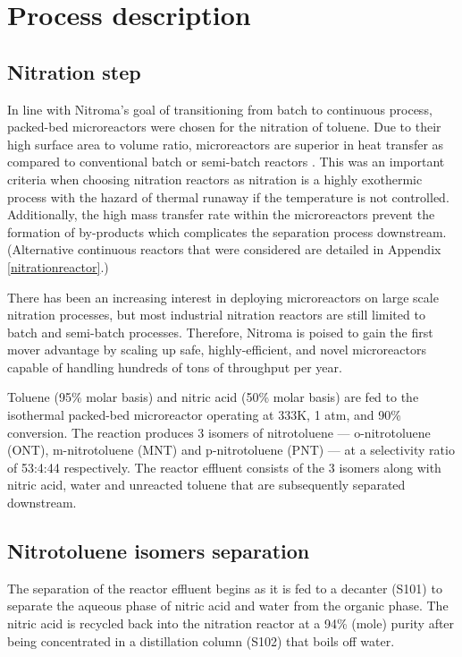 \section{Process description}
\label{sec:process}
\subsection{Nitration step}
In line with Nitroma's goal of transitioning from batch to continuous process, packed-bed microreactors were chosen for the nitration of toluene. Due to their high surface area to volume ratio, microreactors are superior in heat transfer as compared to conventional batch or semi-batch reactors \cite{halder_nitration_2007}. This was an important criteria when choosing nitration reactors as nitration is a highly exothermic process with the hazard of thermal runaway if the temperature is not controlled. Additionally, the high mass transfer rate within the microreactors prevent the formation of by-products \cite{halder_nitration_2007} which complicates the separation process downstream.
(Alternative continuous reactors that were considered are detailed in Appendix \ref{nitrationreactor}.)

There has been an increasing interest in deploying microreactors on large scale nitration processes, but most industrial nitration reactors are still limited to batch and semi-batch processes. Therefore, Nitroma is poised to gain the first mover advantage by scaling up safe, highly-efficient, and novel microreactors capable of handling hundreds of tons of throughput per year.

Toluene (95\% molar basis) and nitric acid (50\% molar basis) are fed to the isothermal packed-bed microreactor operating at 333K, 1 atm, and 90\% conversion. The reaction produces 3 isomers of nitrotoluene --- o-nitrotoluene (ONT), m-nitrotoluene (MNT) and p-nitrotoluene (PNT) --- at a selectivity ratio of 53:4:44 respectively. The reactor effluent consists of the 3 isomers along with nitric acid, water and unreacted toluene that are subsequently separated downstream.

\subsection{Nitrotoluene isomers separation}
The separation of the reactor effluent begins as it is fed to a decanter (S101) to separate the aqueous phase of nitric acid and water from the organic phase. The nitric acid is recycled back into the nitration reactor at a 94\% (mole) purity after being concentrated in a distillation column (S102) that boils off water.


